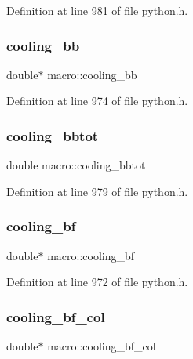 Definition at line 981 of file python.\+h.

\mbox{\label{structmacro_a344b8e9e0f658f06e2397bd4880caf58}} 
\subsubsection{\texorpdfstring{cooling\+\_\+bb}{cooling\_bb}}
{\footnotesize\ttfamily double$\ast$ macro\+::cooling\+\_\+bb}



Definition at line 974 of file python.\+h.

\mbox{\label{structmacro_a85eac8200ef941e212d8c6b8d0bbf8cf}} 
\subsubsection{\texorpdfstring{cooling\+\_\+bbtot}{cooling\_bbtot}}
{\footnotesize\ttfamily double macro\+::cooling\+\_\+bbtot}



Definition at line 979 of file python.\+h.

\mbox{\label{structmacro_a28a025132e5524e22892ce363a37988c}} 
\subsubsection{\texorpdfstring{cooling\+\_\+bf}{cooling\_bf}}
{\footnotesize\ttfamily double$\ast$ macro\+::cooling\+\_\+bf}



Definition at line 972 of file python.\+h.

\mbox{\label{structmacro_a949003584c6b25a51657f2eb341abee4}} 
\subsubsection{\texorpdfstring{cooling\+\_\+bf\+\_\+col}{cooling\_bf\_col}}
{\footnotesize\ttfamily double$\ast$ macro\+::cooling\+\_\+bf\+\_\+col}




